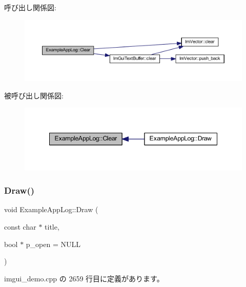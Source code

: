 呼び出し関係図\+:\nopagebreak
\begin{figure}[H]
\begin{center}
\leavevmode
\includegraphics[width=350pt]{struct_example_app_log_ab9c298defddbb106fdfe4ab16c5eebac_cgraph}
\end{center}
\end{figure}
被呼び出し関係図\+:\nopagebreak
\begin{figure}[H]
\begin{center}
\leavevmode
\includegraphics[width=348pt]{struct_example_app_log_ab9c298defddbb106fdfe4ab16c5eebac_icgraph}
\end{center}
\end{figure}
\mbox{\label{struct_example_app_log_a5ad3a4bdb89171b84aeaff96948a1f77}} 
\subsubsection{\texorpdfstring{Draw()}{Draw()}}
{\footnotesize\ttfamily void Example\+App\+Log\+::\+Draw (\begin{DoxyParamCaption}\item[{const char $\ast$}]{title,  }\item[{bool $\ast$}]{p\+\_\+open = {\ttfamily NULL} }\end{DoxyParamCaption})\hspace{0.3cm}{\ttfamily [inline]}}



 imgui\+\_\+demo.\+cpp の 2659 行目に定義があります。

